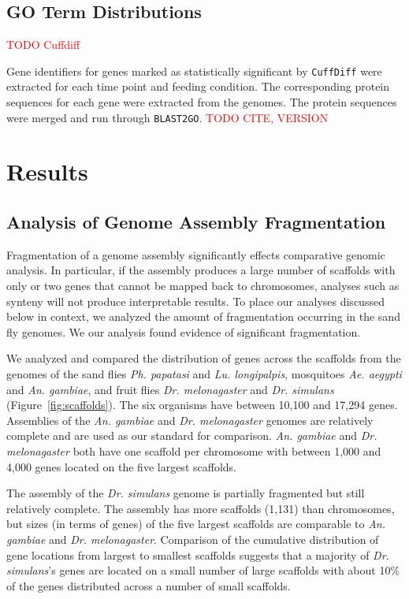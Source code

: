 \subsection{GO Term Distributions}

\textcolor{red}{TODO Cuffdiff}

Gene identifiers for genes marked as statistically significant by \texttt{CuffDiff} were extracted for each time point and feeding condition.  The corresponding protein sequences for each gene were extracted from the genomes.  The protein sequences were merged and run through \texttt{BLAST2GO}. \textcolor{red}{TODO CITE, VERSION}

\section{Results}

\subsection{Analysis of Genome Assembly Fragmentation}
Fragmentation of a genome assembly significantly effects comparative genomic analysis.  In particular, if the assembly produces a large number of scaffolds with only or two genes that cannot be mapped back to chromosomes, analyses such as synteny will not produce interpretable results.  To place our analyses discussed below in context, we analyzed the amount of fragmentation occurring in the sand fly genomes.  We our analysis found evidence of significant fragmentation.

We analyzed and compared the distribution of genes across the scaffolds from the genomes of the sand flies \emph{Ph. papatasi} and \emph{Lu. longipalpis}, mosquitoes \emph{Ae. aegypti} and \emph{An. gambiae}, and fruit flies \emph{Dr. melonagaster} and \emph{Dr. simulans} (Figure~\ref{fig:scaffolds}).  The six organisms have between 10,100 and 17,294 genes.  Assemblies of the \emph{An. gambiae} and \emph{Dr. melonagaster} genomes are relatively complete and are used as our standard for comparison.  \emph{An. gambiae} and \emph{Dr. melonagaster} both have one scaffold per chromosome with between 1,000 and 4,000 genes located on the five largest scaffolds.

The assembly of the \emph{Dr. simulans} genome is partially fragmented but still relatively complete.  The assembly has more scaffolds (1,131) than chromosomes, but sizes (in terms of genes) of the five largest scaffolds are comparable to \emph{An. gambiae} and \emph{Dr. melonagaster}.  Comparison of the cumulative distribution of gene locations from largest to smallest scaffolds suggests that a majority of \emph{Dr. simulans}'s genes are located on a small number of large scaffolds with about 10\% of the genes distributed across a number of small scaffolds.

